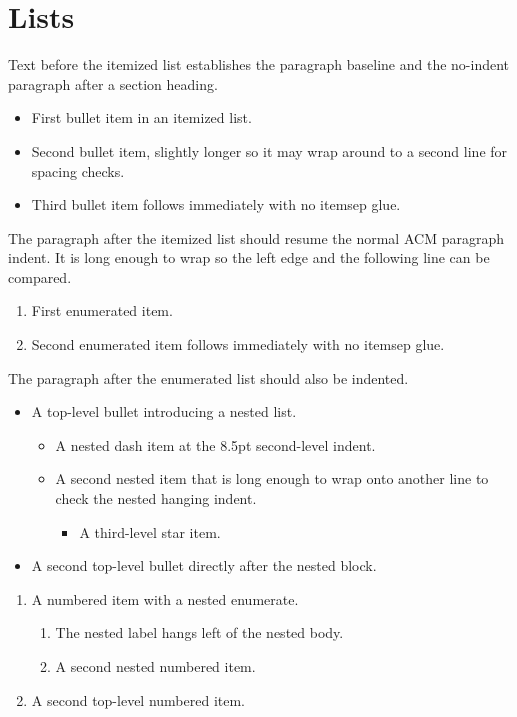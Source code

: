 \documentclass[acmsmall,nonacm]{acmart}
\begin{document}
\thispagestyle{empty}

\section{Lists}
Text before the itemized list establishes the paragraph baseline and the
no-indent paragraph after a section heading.

\begin{itemize}
\item First bullet item in an itemized list.
\item Second bullet item, slightly longer so it may wrap around to a second line
  for spacing checks.
\item Third bullet item follows immediately with no itemsep glue.
\end{itemize}

The paragraph after the itemized list should resume the normal ACM paragraph
indent. It is long enough to wrap so the left edge and the following line can be
compared.

\begin{enumerate}
\item First enumerated item.
\item Second enumerated item follows immediately with no itemsep glue.
\end{enumerate}

The paragraph after the enumerated list should also be indented.

\begin{itemize}
\item A top-level bullet introducing a nested list.
  \begin{itemize}
  \item A nested dash item at the 8.5pt second-level indent.
  \item A second nested item that is long enough to wrap onto another line to
    check the nested hanging indent.
    \begin{itemize}
    \item A third-level star item.
    \end{itemize}
  \end{itemize}
\item A second top-level bullet directly after the nested block.
\end{itemize}

\begin{enumerate}
\item A numbered item with a nested enumerate.
  \begin{enumerate}
  \item The nested label hangs left of the nested body.
  \item A second nested numbered item.
  \end{enumerate}
\item A second top-level numbered item.
\end{enumerate}
\end{document}

